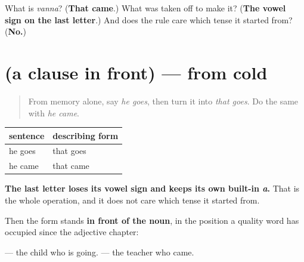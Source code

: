 \begin{tcolorbox}[breakable,colback=teal!4,colframe=teal!35!black,title={Before you move on}]
What is \emph{vanna}? (\textbf{That came}.) What was taken off to make it? (\textbf{The vowel sign on the last letter}.) And does the rule care which tense it started from? (\textbf{No.})
\end{tcolorbox}
\section[(a clause in front)]{(a clause in front) — from cold}

\label{lesson:ML-R90-participle-recall}



\begin{quote}
From memory alone, say \emph{he goes}, then turn it into \emph{that goes}. Do the same with \emph{he came}.
\end{quote}

\begin{grammarlens}[title={Grammar Lens: one vowel sign, and a whole construction}]
\noindent
\begin{tabularx}{\linewidth}{@{}>{\raggedright\arraybackslash}X>{\raggedright\arraybackslash}X@{}}
\toprule
\textbf{sentence} & \textbf{describing form} \\
\midrule
\textbf{\ml{പോകുന്നു}} he goes & \textbf{\ml{പോകുന്ന}} that goes \\
\textbf{\ml{വന്നു}} he came & \textbf{\ml{വന്ന}} that came \\
\bottomrule
\end{tabularx}

\textbf{The last letter loses its vowel sign and keeps its own built-in \emph{a}.} That is the whole operation, and it does not care which tense it started from.

Then the form stands \textbf{in front of the noun}, in the position a quality word has occupied since the adjective chapter:

\textbf{ } — the child who is going. \textbf{ } — the teacher who came.
\end{grammarlens}

